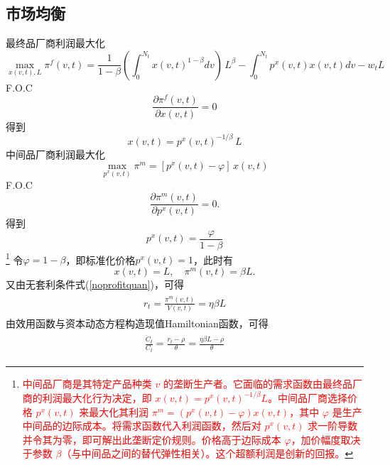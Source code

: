 \documentclass[cn,normal,11pt,black]{elegantnote}
\begin{document}
\subsection{市场均衡}


    最终品厂商利润最大化
    \begin{equation}
        \max_{x(v,t), L} \pi^{f}(v,t) = 
            \frac{1}{1-\beta} \left( \int_0^{N_t} x(v,t)^{1-\beta} dv \right) \, L^\beta 
            - \int_0^{N_t} p^x(v,t)x(v,t)dv - w_t L
    \end{equation}
    F.O.C
    \begin{equation}
        \frac{\partial \pi^f(v,t)}{\partial x(v,t)} = 0
    \end{equation}
    得到
    \begin{equation} \label{quanmx}
        x(v,t) = {p^x(v,t)}^{-1/\beta} \, L
    \end{equation}
    中间品厂商利润最大化
    \begin{equation}
        \max_{p^x(v,t)} \pi^m = \left[p^x(v,t) - \varphi\right] \, x(v,t)
    \end{equation}
    F.O.C
    \begin{equation}
        \frac{\partial \pi^m(v,t)}{\partial p^x(v,t)} = 0.
    \end{equation}
    得到
    \begin{equation} \label{quanmxp}
        p^x(v,t) = \frac{\varphi}{1-\beta} 
    \end{equation}\footnote{\textcolor{red}{中间品厂商是其特定产品种类 $v$ 的垄断生产者。它面临的需求函数由最终品厂商的利润最大化行为决定，即 $x(v,t) = {p^x(v,t)}^{-1/\beta} L$。中间品厂商选择价格 $p^x(v,t)$ 来最大化其利润 $\pi^m = (p^x(v,t) - \varphi)x(v,t)$，其中 $\varphi$ 是生产中间品的边际成本。将需求函数代入利润函数，然后对 $p^x(v,t)$ 求一阶导数并令其为零，即可解出此垄断定价规则。价格高于边际成本 $\varphi$，加价幅度取决于参数 $\beta$（与中间品之间的替代弹性相关）。这个超额利润是创新的回报。}}
    令$\varphi = 1-\beta$，即标准化价格$p^x(v,t)=1$，此时有
    \begin{equation}
        x(v,t) = L, \quad \pi^m(v,t) = \beta L.
    \end{equation}
    又由无套利条件式(\ref{noprofitquan})，可得
    \begin{align}
    \begin{aligned}
        r_t = \frac{\pi^m(v,t)}{V(v,t)}  = \eta \beta L
    \end{aligned}
    \end{align}
    由效用函数与资本动态方程构造现值Hamiltonian函数，可得
    \begin{align}
    \begin{aligned}
        \frac{\dot{C}_t}{C_t} = \frac{r_t -  \rho}{\theta}  = \frac{\eta \beta L -  \rho}{\theta}
    \end{aligned}
    \end{align}
\end{document}
